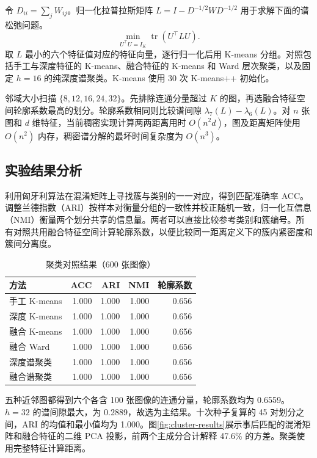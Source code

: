 令 $D_{ii}=\sum_j W_{ij}$。归一化拉普拉斯矩阵 $L=I-D^{-1/2}WD^{-1/2}$ 用于求解下面的谱松弛问题\cite{ng2001}。
\begin{equation}
 \min_{U^\top U=I_K}\operatorname{tr}(U^\top L U).
\end{equation}
取 $L$ 最小的六个特征值对应的特征向量，逐行归一化后用 K-means 分组。对照包括手工与深度特征的 K-means、融合特征的 K-means 和 Ward 层次聚类，以及固定 $h=16$ 的纯深度谱聚类。K-means 使用 30 次 K-means++ 初始化。

邻域大小扫描 $\{8,12,16,24,32\}$。先排除连通分量超过 $K$ 的图，再选融合特征空间轮廓系数最高的划分。轮廓系数相同则比较谱间隙 $\lambda_7(L)-\lambda_6(L)$。对 $n$ 张图和 $d$ 维特征，当前稠密实现计算两两距离用时 $O(n^2d)$，图及距离矩阵使用 $O(n^2)$ 内存，稠密谱分解的最坏时间复杂度为 $O(n^3)$。

\subsection{实验结果分析}
利用匈牙利算法在混淆矩阵上寻找簇与类别的一一对应，得到匹配准确率 ACC。调整兰德指数（ARI）按样本对衡量分组的一致性并校正随机一致，归一化互信息（NMI）衡量两个划分共享的信息量。两者可以直接比较参考类别和簇编号。所有对照共用融合特征空间计算轮廓系数，以便比较同一距离定义下的簇内紧密度和簇间分离度。

\begin{table}[tbp]
 \caption{聚类对照结果（600 张图像）}
 \label{tab:clustering}
 \centering
 \begin{tabular}{@{}lrrrr@{}}
 \toprule
 方法 & ACC & ARI & NMI & 轮廓系数 \\
 \midrule
 手工 K-means & 1.000 & 1.000 & 1.000 & 0.656 \\
 深度 K-means & 1.000 & 1.000 & 1.000 & 0.656 \\
 融合 K-means & 1.000 & 1.000 & 1.000 & 0.656 \\
 融合 Ward & 1.000 & 1.000 & 1.000 & 0.656 \\
 深度谱聚类 & 1.000 & 1.000 & 1.000 & 0.656 \\
 融合谱聚类 & 1.000 & 1.000 & 1.000 & 0.656 \\
 \bottomrule
 \end{tabular}
\end{table}

五种近邻图都得到六个各含 100 张图像的连通分量，轮廓系数均为 0.6559。$h=32$ 的谱间隙最大，为 0.2889，故选为主结果。十次种子复算的 45 对划分之间，ARI 的均值和最小值均为 1.000。图\ref{fig:cluster-results}展示事后匹配的混淆矩阵和融合特征的二维 PCA 投影，前两个主成分合计解释 47.6\% 的方差。聚类使用完整特征计算距离。

